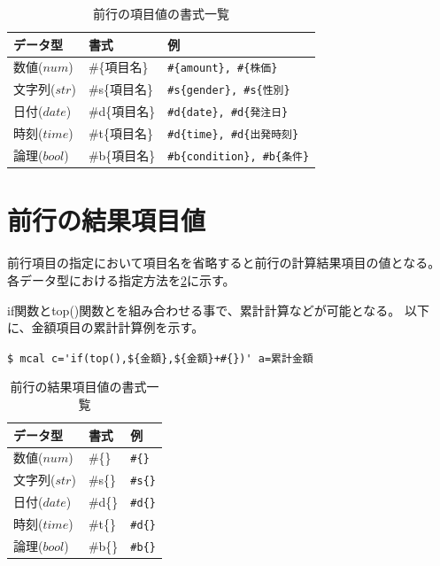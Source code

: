 \begin{table}[!hb]
\begin{center}
\caption{前行の項目値の書式一覧\label{tbl:mcal_prev}}
{\small
  \begin{tabular}{l|l|l} \hline
データ型&書式&例\\ \hline
数値($num$)   & \#\{項目名\}  & \verb|#{amount}, #{株価}|\\
文字列($str$) & \#s\{項目名\} & \verb|#s{gender}, #s{性別}|\\
日付($date$)  & \#d\{項目名\} & \verb|#d{date}, #d{発注日}| \\
時刻($time$)  & \#t\{項目名\} & \verb|#d{time}, #d{出発時刻}| \\
論理($bool$)  & \#b\{項目名\} & \verb|#b{condition}, #b{条件}| \\

\hline
  \end{tabular}
  }
  \end{center}
\end{table}

\section{前行の結果項目値}
前行項目の指定において項目名を省略すると前行の計算結果項目の値となる。
各データ型における指定方法を\ref{tbl:mcal_prev_rsl}に示す。

if関数とtop()関数とを組み合わせる事で、累計計算などが可能となる。
以下に、金額項目の累計計算例を示す。

\verb|$ mcal c='if(top(),${金額},${金額}+#{})' a=累計金額|


\begin{table}[!hb]
\begin{center}
\caption{前行の結果項目値の書式一覧\label{tbl:mcal_prev_rsl}}
{\small
  \begin{tabular}{l|l|l} \hline
データ型&書式&例\\ \hline
数値($num$)   & \#\{\}  & \verb|#{}|\\
文字列($str$) & \#s\{\} & \verb|#s{}|\\
日付($date$)  & \#d\{\} & \verb|#d{}| \\
時刻($time$)  & \#t\{\} & \verb|#d{}| \\
論理($bool$)  & \#b\{\} & \verb|#b{}| \\

\hline
  \end{tabular}
  }
  \end{center}
\end{table}


